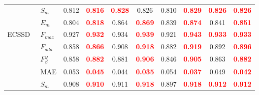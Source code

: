 \documentclass[runningheads]{llncs}
\begin{document}
\begin{table}[H]
{\begin{tabular}{l|l|cc|cc|cc|cc}
                                               & $S_{m}$                                                     & 0.812                           & \textcolor{red}{\textbf{0.816}} & \textcolor{red}{\textbf{0.828}} & 0.826                           & 0.810 & \textcolor{red}{\textbf{0.829}} & \textcolor{red}{\textbf{0.826}} & \textcolor{red}{\textbf{0.826}} \\
                                               & $E_{m}$                                                     & 0.804                           & \textcolor{red}{\textbf{0.818}} & 0.864                           & \textcolor{red}{\textbf{0.869}} & 0.839 & \textcolor{red}{\textbf{0.874}} & 0.841                           & \textcolor{red}{\textbf{0.851}} \\ \hline
   \multirow{6}{*}{ECSSD~\cite{ECSSD}}         & $F_{max}$                                                   & 0.927                           & \textcolor{red}{\textbf{0.932}} & 0.934                           & \textcolor{red}{\textbf{0.939}} & 0.921 & \textcolor{red}{\textbf{0.943}} & \textcolor{red}{\textbf{0.933}} & \textcolor{red}{\textbf{0.933}} \\
                                               & $F_{ada}$                                                   & 0.858                           & \textcolor{red}{\textbf{0.866}} & 0.908                           & \textcolor{red}{\textbf{0.918}} & 0.882 & \textcolor{red}{\textbf{0.919}} & 0.892                           & \textcolor{red}{\textbf{0.896}} \\
                                               & $F^{\omega}_{\beta}$                                        & 0.858                           & \textcolor{red}{\textbf{0.882}} & 0.881                           & \textcolor{red}{\textbf{0.906}} & 0.846 & \textcolor{red}{\textbf{0.905}} & 0.863                           & \textcolor{red}{\textbf{0.882}} \\
                                               & MAE                                                         & 0.053                           & \textcolor{red}{\textbf{0.045}} & 0.044                           & \textcolor{red}{\textbf{0.035}} & 0.054 & \textcolor{red}{\textbf{0.037}} & 0.049                           & \textcolor{red}{\textbf{0.042}} \\
                                               & $S_{m}$                                                     & 0.908                           & \textcolor{red}{\textbf{0.910}} & 0.911                           & \textcolor{red}{\textbf{0.918}} & 0.897 & \textcolor{red}{\textbf{0.918}} & \textcolor{red}{\textbf{0.912}} & \textcolor{red}{\textbf{0.912}} \\

\end{tabular}}
\end{table}
\end{document}
